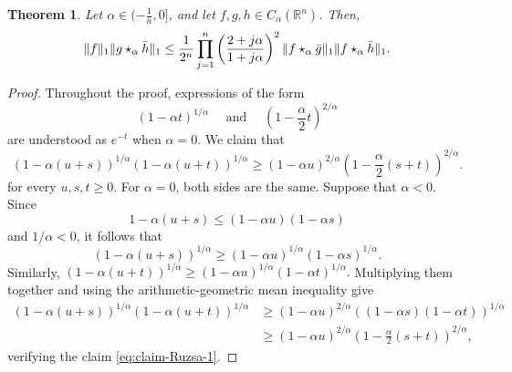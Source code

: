 \documentclass[11pt]{amsart}
\newcommand{\R}{{\mathbb R}}
\theoremstyle{plain}
\newtheorem{theorem}{Theorem}[section]
\theoremstyle{definition}
\theoremstyle{remark}
\begin{document}
\begin{theorem} \label{thm:ruza-functional}
    Let $\alpha \in (-\frac{1}{n},0]$, and let $f,g,h  \in C_\alpha (\R^n)$. Then,
    \[
        \|f\|_1 \|g \star_\alpha \Bar h\|_1 \leq \frac{1}{2^n} \prod_{j=1}^n\left(\frac{2+j \alpha}{1+j \alpha}\right)^2 \|f \star_\alpha \Bar g \|_1 \|f \star_\alpha \Bar h \|_1.
    \]
\end{theorem}
\begin{proof}
Throughout the proof, expressions of the form
$$
(1-\alpha t)^{1 / \alpha} \quad \text { and } \quad \left(1-\frac{\alpha}{2} t\right)^{2 / \alpha}
$$
are understood as $e^{-t}$ when $\alpha=0$.
We claim that
\begin{equation} \label{eq:claim-Ruzsa-1}
    (1-\alpha(u+s))^{1 / \alpha}(1-\alpha(u+t))^{1 / \alpha} \geq(1-\alpha u)^{2 / \alpha}\left(1-\frac{\alpha}{2}(s+t)\right)^{2 / \alpha}.
\end{equation}
for every $u, s, t \geq 0$. For $\alpha=0$, both sides are the same. Suppose that $\alpha<0$. Since
$$
1-\alpha(u+s) \leq(1-\alpha u)(1-\alpha s)
$$
and $1 / \alpha<0$, it follows that
$$
(1-\alpha(u+s))^{1 / \alpha} \geq(1-\alpha u)^{1 / \alpha}(1-\alpha s)^{1 / \alpha} .
$$
Similarly,
$
(1-\alpha(u+t))^{1 / \alpha} \geq(1-\alpha u)^{1 / \alpha}(1-\alpha t)^{1 / \alpha} .
$
Multiplying them together and using the arithmetic-geometric mean inequality give
\begin{align}
(1-\alpha(u+s))^{1 / \alpha}(1-\alpha(u+t))^{1 / \alpha}
&\geq(1-\alpha u)^{2 / \alpha}((1-\alpha s)(1-\alpha t))^{1 / \alpha}
\\
&\geq (1-\alpha u)^{2 / \alpha} \left(1-\frac{\alpha}{2}(s+t)\right)^{2 / \alpha} ,
\end{align}
verifying the claim \eqref{eq:claim-Ruzsa-1}.


\end{proof}
\end{document}
